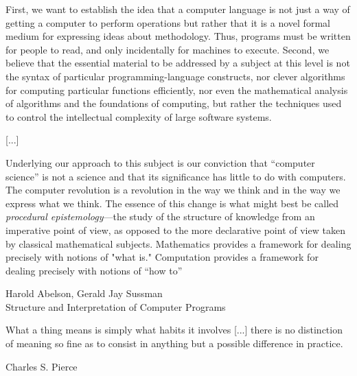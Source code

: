 
\markboth{}{}

\vspace*{2cm}

First, we want to establish the idea that a computer language is not
just a way of getting a computer to perform operations but rather that
it is a novel formal medium for expressing ideas about methodology.
Thus, programs must be written for people to read, and only
incidentally for machines to execute. Second, we believe that the
essential material to be addressed by a subject at this level is not
the syntax of particular programming-language constructs, nor clever
algorithms for computing particular functions efficiently, nor even
the mathematical analysis of algorithms and the foundations of
computing, but rather the techniques used to control the intellectual
complexity of large software systems.

[...]

Underlying our approach to this subject is our conviction that
``computer science'' is not a science and that its significance has
little to do with computers. The computer revolution is a revolution
in the way we think and in the way we express what we think. The
essence of this change is what might best be called {\em procedural
  epistemology}---the study of the structure of knowledge from an
imperative point of view, as opposed to the more declarative point of
view taken by classical mathematical subjects. Mathematics provides a
framework for dealing precisely with notions of "what is." Computation
provides a framework for dealing precisely with notions of ``how to''

\begin{flushright}
 Harold Abelson, Gerald Jay Sussman\\
Structure and Interpretation of Computer Programs \cite{AbelsonH+99}
\end{flushright}
\vspace{2cm}

What a thing means is simply what habits it involves [...] there is
no distinction of meaning so fine as to consist in anything but a
possible difference in practice.

\begin{flushright}
Charles S. Pierce \cite{PierceCS1878}
\end{flushright}
